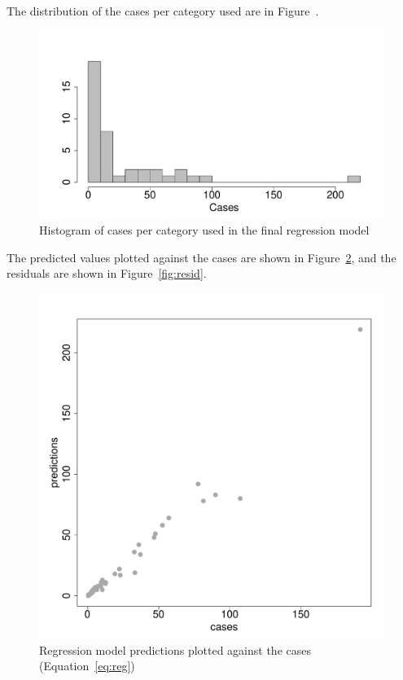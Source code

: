 \documentclass{article}
\begin{document}
The distribution of the cases per category used are in Figure~.
\begin{figure}[h!]
\begin{center}
\includegraphics{interimreport2-014}
\end{center}
\caption{Histogram of cases per category used in the final regression model}
\label{fig:histcasecat}
\end{figure}

The predicted values plotted against the cases are shown in Figure~\ref{fig:predict}, and the residuals are shown in Figure~\ref{fig:resid}.
\begin{figure}[h!]
\begin{center}
\includegraphics{interimreport2-015}
\end{center}
\caption{Regression model predictions plotted against the cases (Equation~\ref{eq:reg})}
\label{fig:predict}
\end{figure}
\end{document}
